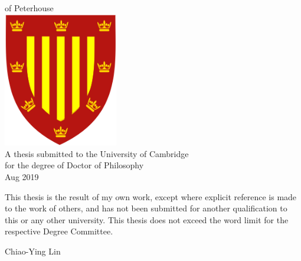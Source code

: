 \begin{center}%
	\begin{doublespace}%
		{\Huge\textbf{\thetitle}}\\%
	\end{doublespace}%
	\vspace*{3cm}%
	{\Large{\theauthor} \\ of Peterhouse }\\%
	\vspace*{3cm}%
	\includegraphics[width=5cm]{Peterhouse.png} \\
	\vspace*{2cm}
	{A thesis submitted to the University of Cambridge\\ for the degree of Doctor of Philosophy \\ Aug 2019}
\end{center}%
\begin{declaration}
	This thesis is the result of my own work, except where explicit
	reference is made to the work of others, and has not been submitted
	for another qualification to this or any other university. This
	thesis does not exceed the word limit for the respective Degree
	Committee.
	\vspace*{1cm}
	\begin{flushright}
		Chiao-Ying Lin
	\end{flushright}
\end{declaration}
